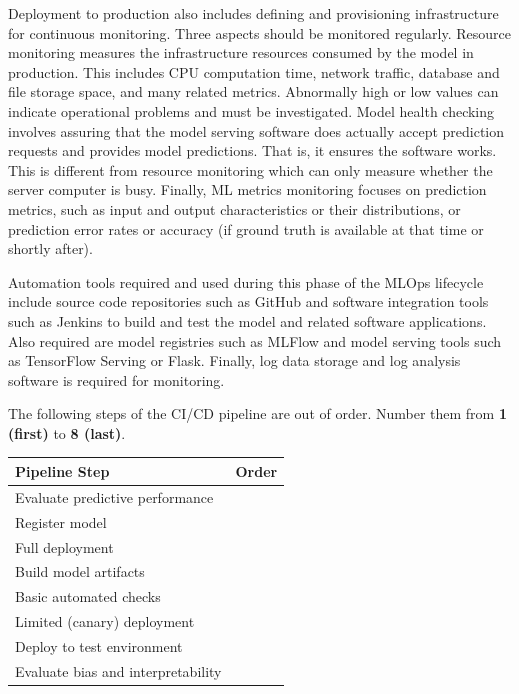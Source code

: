 Deployment to production also includes defining and provisioning infrastructure for continuous monitoring. Three aspects should be monitored regularly. Resource monitoring measures the infrastructure resources consumed by the model in production. This includes CPU computation time, network traffic, database and file storage space, and many related metrics. Abnormally high or low values can indicate operational problems and must be investigated. Model health checking involves assuring that the model serving software does actually accept prediction requests and provides model predictions. That is, it ensures the software works. This is different from resource monitoring which can only measure whether the server computer is busy. Finally, ML metrics monitoring focuses on prediction metrics, such as input and output characteristics or their distributions, or prediction error rates or accuracy (if ground truth is available at that time or shortly after). 

Automation tools required and used during this phase of the MLOps lifecycle include source code repositories such as GitHub and software integration tools such as Jenkins to build and test the model and related software applications. Also required are model registries such as MLFlow and model serving tools such as TensorFlow Serving or Flask. Finally, log data storage and log analysis software is required for monitoring. 


\begin{exerciseboxpaper}
The following steps of the CI/CD pipeline are out of order. Number them from \textbf{1 (first)} to \textbf{8 (last)}.

\bigskip

\renewcommand{\arraystretch}{1.25}
\begin{tabular}{|l|c|}
\hline
\textbf{Pipeline Step} & \textbf{Order} \\
\hline
Evaluate predictive performance & \\
\hline
Register model & \\
\hline
Full deployment & \\
\hline
Build model artifacts & \\
\hline
Basic automated checks & \\
\hline
Limited (canary) deployment & \\
\hline
Deploy to test environment & \\
\hline
Evaluate bias and interpretability & \\
\hline
\end{tabular}
\end{exerciseboxpaper}


